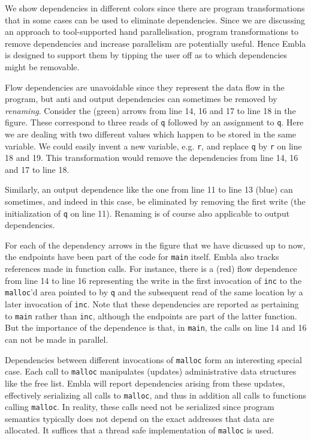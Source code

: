 We show dependencies in different colors since there are program
transformations that in some cases can be used to eliminate 
dependencies. Since we are discussing an approach to tool-supported
hand parallelisation, program transformations to remove dependencies
and increase parallelism are potentially useful. Hence Embla is 
designed to support them by tipping the user off as to which
dependencies might be removable.

Flow dependencies are unavoidable since they represent the data flow 
in the program, but anti and output dependencies can sometimes be 
removed by {\em renaming}. Consider the (green) arrows from line 
14, 16 and 17 to line 18 in the figure. These correspond to three
reads of {\tt q} followed by an assignment to {\tt q}. Here we 
are dealing with two different values which happen to be stored 
in the same variable. We could easily invent a new variable, e.g. 
{\tt r}, and replace {\tt q} by {\tt r} on line 18 and 19. This 
transformation would remove the dependencies from line 14, 16 and
17 to line 18. 

Similarly, an output dependence like the one from line 11 to line 13
(blue) can sometimes, and indeed in this case, be eliminated by 
removing the first write (the initialization of {\tt q} on line 11).
Renaming is of course also applicable to output dependencies.

For each of the dependency arrows in the figure that 
we have dicussed up to now, the endpoints have been part of the 
code for {\tt main}
itself. Embla also tracks references made in function calls. For
instance, there is a (red) flow dependence from line 14 to line 16
representing the write in the first invocation of {\tt inc} to the 
{\tt malloc}'d area pointed to by {\tt q} and the subsequent read 
of the same location by a later invocation of {\tt inc}. 
Note that these dependencies 
are reported as pertaining to {\tt main} rather than {\tt inc},
although the endpoints are part of the latter function. 
But the importance of the dependence is that, in {\tt main}, the calls
on line 14 and 16 can not be made in parallel.

Dependencies between different invocations of {\tt malloc} form 
an interesting special case.
Each call to {\tt malloc} manipulates (updates) 
administrative data structures like the free list. Embla will
report dependencies arising from these updates, 
effectively serializing all calls to 
{\tt malloc}, and thus in addition all calls to functions calling
{\tt malloc}. In reality, these calls need not be serialized since
program semantics typically does not depend on the exact addresses 
that data are allocated. It suffices that a thread safe 
implementation of {\tt malloc} is used.

